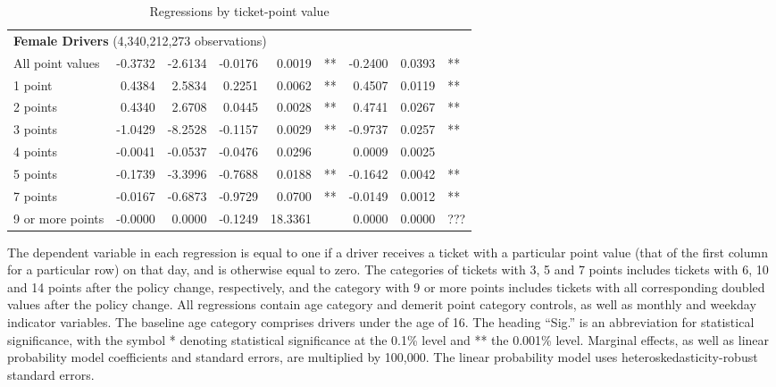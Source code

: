 \begin{table}
\begin{tabular}{l r r r r l r r l}
\hline 

\multicolumn{8}{l}{\textbf{Female Drivers} (4,340,212,273 observations)} \\ 

All point values                &  -0.3732        &  -2.6134       &  -0.0176        &  0.0019       &   **       &  -0.2400        &  0.0393       &   **       \\ 
1 point                         &  0.4384        &  2.5834       &  0.2251        &  0.0062       &   **       &  0.4507        &  0.0119       &   **       \\ 
2 points                        &  0.4340        &  2.6708       &  0.0445        &  0.0028       &   **       &  0.4741        &  0.0267       &   **       \\ 
3 points                        &  -1.0429        &  -8.2528       &  -0.1157        &  0.0029       &   **       &  -0.9737        &  0.0257       &   **       \\ 
4 points                        &  -0.0041        &  -0.0537       &  -0.0476        &  0.0296       &            &  0.0009        &  0.0025       &            \\ 
5 points                        &  -0.1739        &  -3.3996       &  -0.7688        &  0.0188       &   **       &  -0.1642        &  0.0042       &   **       \\ 
7 points                        &  -0.0167        &  -0.6873       &  -0.9729        &  0.0700       &   **       &  -0.0149        &  0.0012       &   **       \\ 
9 or more points                &  -0.0000        &  0.0000       &  -0.1249        &  18.3361       &            &  0.0000        &  0.0000       &  ???       \\ 

\hline 

\end{tabular} 
\caption{Regressions by ticket-point value} 
The dependent variable in each regression is equal to one  
if a driver receives a ticket with a particular point value   
(that of the first column for a particular row) on that day,  
and is otherwise equal to zero. 
The categories of tickets with 3, 5 and 7 points includes tickets  
with 6, 10 and 14 points after the policy change, respectively,  
and the category with 9 or more points includes tickets  
with all corresponding doubled values after the policy change. 
All regressions contain age category and demerit point category controls, 
as well as monthly and weekday indicator variables. 
The baseline age category comprises drivers under the age of 16. 
The heading ``Sig.'' is an abbreviation for statistical significance, with 
the symbol * denoting statistical significance at the 0.1\% level 
and ** the 0.001\% level. 
Marginal effects, as well as linear probability model coefficients and standard errors, are  
multiplied by 100,000.  
The linear probability model uses heteroskedasticity-robust standard errors.  
\label{tab:seas_Logit_vs_LPMx100K_regs_by_points} 
\end{table} 
 
